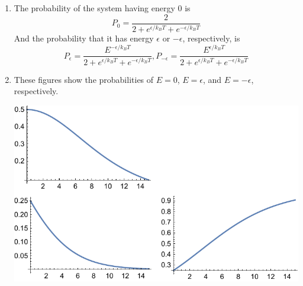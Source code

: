 \documentclass[10pt]{article}
\begin{document}
\begin{enumerate}
\begin{enumerate}
      \item The probability of the system having energy 0 is
      \begin{equation*}
          P_0 = \frac{2}{2 + e^{\epsilon/k_B T} + e^{-\epsilon/k_B T}}
      \end{equation*}
      And the probability that it has energy $\epsilon$ or $-\epsilon$, respectively, is
      \begin{equation*}
          P_{\epsilon} = \frac{E^{-\epsilon/k_B T}}{2 + e^{\epsilon/k_B T} + e^{-\epsilon/k_B T}},
          P_{-\epsilon} = \frac{E^{\epsilon/k_B T}}{2 + e^{\epsilon/k_B T} + e^{-\epsilon/k_B T}}
      \end{equation*}

      \item These figures show the probabilities of $E=0$, $E=\epsilon$, and $E=-\epsilon$, respectively.

      \includegraphics{p314cgraphs}
  \end{enumerate}
  \end{enumerate}
\end{document}

